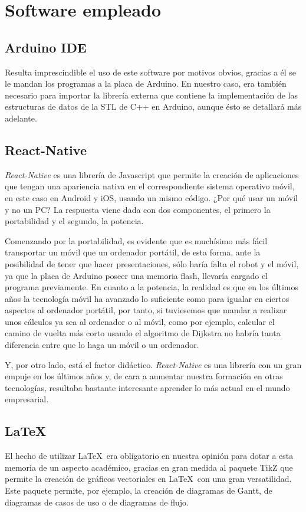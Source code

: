 


\section{Software empleado}
\subsection{Arduino IDE}
Resulta imprescindible el uso de este software por motivos obvios, gracias a él se le mandan los programas a la placa de Arduino. En nuestro caso, era también necesario para importar la librería externa que contiene la implementación de las estructuras de datos de la STL de C++ en Arduino, aunque ésto se detallará más adelante.

\subsection{React-Native}
\textit{React-Native} es una librería de Javascript que permite la creación de aplicaciones que tengan una apariencia nativa en el correspondiente sistema operativo móvil, en este caso en Android y iOS, usando un mismo código. ¿Por qué usar un móvil y no un PC? La respuesta viene dada con dos componentes, el primero la portabilidad y el segundo, la potencia.

Comenzando por la portabilidad, es evidente que es muchísimo más fácil transportar un móvil que un ordenador portátil, de esta forma, ante la posibilidad de tener que hacer presentaciones, sólo haría falta el robot y el móvil, ya que la placa de Arduino poseer una memoria flash, llevaría cargado el programa previamente. En cuanto a la potencia, la realidad es que en los últimos años la tecnología móvil ha avanzado lo suficiente como para igualar en ciertos aspectos al ordenador portátil, por tanto, si tuviesemos que mandar a realizar unos cálculos ya sea al ordenador o al móvil, como por ejemplo, calcular el camino de vuelta más corto usando el algoritmo de Dijkstra no habría tanta diferencia entre que lo haga un móvil o un ordenador.

Y, por otro lado, está el factor didáctico. \textit{React-Native} es una librería con un gran empuje en los últimos años y, de cara a aumentar nuestra formación en otras tecnologías, resultaba bastante interesante aprender lo más actual en el mundo empresarial.

\subsection{\LaTeX}
El hecho de utilizar \LaTeX \ era obligatorio en nuestra opinión para dotar a esta memoria de un aspecto académico, gracias en gran medida al paquete TikZ que permite la creación de gráficos vectoriales en \LaTeX \ con una gran versatilidad. Este paquete permite, por ejemplo, la creación de diagramas de Gantt, de diagramas de casos de uso o de diagramas de flujo.
